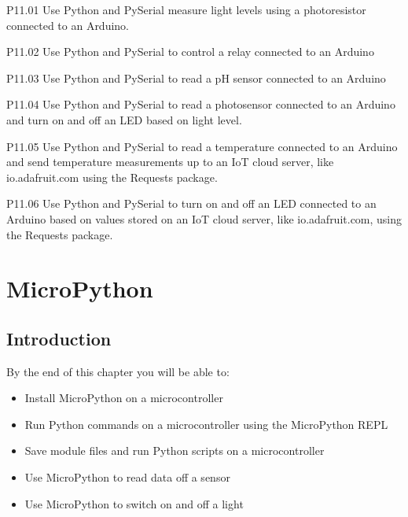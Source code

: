 \documentclass{book}
\begin{document}
    
        P11.01 Use Python and PySerial measure light levels using a
photoresistor connected to an Arduino.

P11.02 Use Python and PySerial to control a relay connected to an
Arduino

P11.03 Use Python and PySerial to read a pH sensor connected to an
Arduino

P11.04 Use Python and PySerial to read a photosensor connected to an
Arduino and turn on and off an LED based on light level.

P11.05 Use Python and PySerial to read a temperature connected to an
Arduino and send temperature measurements up to an IoT cloud server,
like io.adafruit.com using the Requests package.

P11.06 Use Python and PySerial to turn on and off an LED connected to an
Arduino based on values stored on an IoT cloud server, like
io.adafruit.com, using the Requests package.
    




    
        \chapter{MicroPython}\label{micropython}
    




    
        \section{Introduction}\label{introduction}
    




    
        By the end of this chapter you will be able to:

\begin{itemize}
\item
  Install MicroPython on a microcontroller
\item
  Run Python commands on a microcontroller using the MicroPython REPL
\item
  Save module files and run Python scripts on a microcontroller
\item
  Use MicroPython to read data off a sensor
\item
  Use MicroPython to switch on and off a light
\end{itemize}
        \newpage



    
\end{document}
